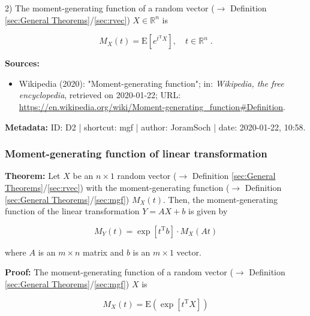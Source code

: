 \documentclass[a4paper,12pt,twoside]{book}
\begin{document}
2) The moment-generating function of a random vector ($\rightarrow$ Definition \ref{sec:General Theorems}/\ref{sec:rvec}) $X \in \mathbb{R}^n$ is

\begin{equation} \label{eq:mgf-mgf-vec}
M_X(t) = \mathrm{E} \left[ e^{t^\mathrm{T}X} \right], \quad t \in \mathbb{R}^n \; .
\end{equation}


\vspace{1em}
\textbf{Sources:}
\begin{itemize}
\item Wikipedia (2020): "Moment-generating function"; in: \textit{Wikipedia, the free encyclopedia}, retrieved on 2020-01-22; URL: \url{https://en.wikipedia.org/wiki/Moment-generating_function#Definition}.
\end{itemize}


\vspace{1em}
\textbf{Metadata:} ID: D2 | shortcut: mgf | author: JoramSoch | date: 2020-01-22, 10:58.
\vspace{1em}



\subsubsection[\textbf{Moment-generating function of linear transformation}]{Moment-generating function of linear transformation} \label{sec:mgf-ltt}
\setcounter{equation}{0}

\textbf{Theorem:} Let $X$ be an $n \times 1$ random vector ($\rightarrow$ Definition \ref{sec:General Theorems}/\ref{sec:rvec}) with the moment-generating function ($\rightarrow$ Definition \ref{sec:General Theorems}/\ref{sec:mgf}) $M_X(t)$. Then, the moment-generating function of the linear transformation $Y = A X + b$ is given by

\begin{equation} \label{eq:mgf-ltt-mgf-ltt}
M_Y(t) = \exp \left[ t^\mathrm{T} b \right] \cdot M_X(At)
\end{equation}

where $A$ is an $m \times n$ matrix and $b$ is an $m \times 1$ vector.


\vspace{1em}
\textbf{Proof:} The moment-generating function of a random vector ($\rightarrow$ Definition \ref{sec:General Theorems}/\ref{sec:mgf}) $X$ is

\begin{equation} \label{eq:mgf-ltt-mfg-vect}
M_X(t) = \mathrm{E} \left( \exp \left[ t^\mathrm{T} X \right] \right)
\end{equation}
\end{document}
